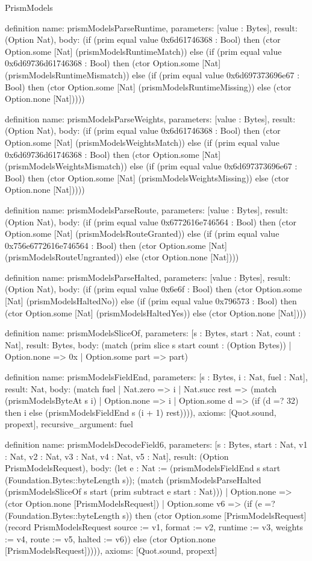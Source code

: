 \begin{lexlean}{PrismModels}
\begin{semanticmodule}
definition{
  name: prismModelsParseRuntime,
  parameters: [value : Bytes],
  result: (Option Nat),
  body: (if (prim equal value 0x6d61746368 : Bool) then (ctor Option.some [Nat] (prismModelsRuntimeMatch)) else (if (prim equal value 0x6d69736d61746368 : Bool) then (ctor Option.some [Nat] (prismModelsRuntimeMismatch)) else (if (prim equal value 0x6d697373696e67 : Bool) then (ctor Option.some [Nat] (prismModelsRuntimeMissing)) else (ctor Option.none [Nat]))))
}

definition{
  name: prismModelsParseWeights,
  parameters: [value : Bytes],
  result: (Option Nat),
  body: (if (prim equal value 0x6d61746368 : Bool) then (ctor Option.some [Nat] (prismModelsWeightsMatch)) else (if (prim equal value 0x6d69736d61746368 : Bool) then (ctor Option.some [Nat] (prismModelsWeightsMismatch)) else (if (prim equal value 0x6d697373696e67 : Bool) then (ctor Option.some [Nat] (prismModelsWeightsMissing)) else (ctor Option.none [Nat]))))
}

definition{
  name: prismModelsParseRoute,
  parameters: [value : Bytes],
  result: (Option Nat),
  body: (if (prim equal value 0x6772616e746564 : Bool) then (ctor Option.some [Nat] (prismModelsRouteGranted)) else (if (prim equal value 0x756e6772616e746564 : Bool) then (ctor Option.some [Nat] (prismModelsRouteUngranted)) else (ctor Option.none [Nat])))
}

definition{
  name: prismModelsParseHalted,
  parameters: [value : Bytes],
  result: (Option Nat),
  body: (if (prim equal value 0x6e6f : Bool) then (ctor Option.some [Nat] (prismModelsHaltedNo)) else (if (prim equal value 0x796573 : Bool) then (ctor Option.some [Nat] (prismModelsHaltedYes)) else (ctor Option.none [Nat])))
}

definition{
  name: prismModelsSliceOf,
  parameters: [s : Bytes, start : Nat, count : Nat],
  result: Bytes,
  body: (match (prim slice s start count : (Option Bytes))
    | Option.none => 0x
    | Option.some part => part)
}

definition{
  name: prismModelsFieldEnd,
  parameters: [s : Bytes, i : Nat, fuel : Nat],
  result: Nat,
  body: (match fuel
    | Nat.zero => i
    | Nat.succ rest => (match (prismModelsByteAt s i)
      | Option.none => i
      | Option.some d => (if (d =? 32) then i else (prismModelsFieldEnd s (i + 1) rest)))),
  axioms: [Quot.sound, propext],
  recursive_argument: fuel
}

definition{
  name: prismModelsDecodeField6,
  parameters: [s : Bytes, start : Nat, v1 : Nat, v2 : Nat, v3 : Nat, v4 : Nat, v5 : Nat],
  result: (Option PrismModelsRequest),
  body: (let e : Nat := (prismModelsFieldEnd s start (Foundation.Bytes::byteLength s)); (match (prismModelsParseHalted (prismModelsSliceOf s start (prim subtract e start : Nat)))
    | Option.none => (ctor Option.none [PrismModelsRequest])
    | Option.some v6 => (if (e =? (Foundation.Bytes::byteLength s)) then (ctor Option.some [PrismModelsRequest] (record PrismModelsRequest {source := v1, format := v2, runtime := v3, weights := v4, route := v5, halted := v6})) else (ctor Option.none [PrismModelsRequest])))),
  axioms: [Quot.sound, propext]
}


\end{semanticmodule}
\end{lexlean}
